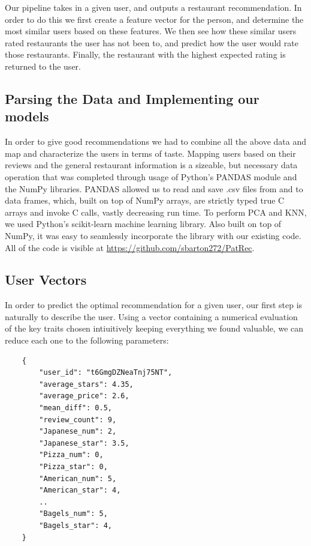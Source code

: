\documentclass[10pt,twocolumn,letterpaper]{article}
\begin{document}
Our pipeline takes in a given user, and outputs a restaurant recommendation. In order to do this we first create a feature vector for the person, and determine the most similar users based on these features. We then see how these similar users rated restaurants the user has not been to, and predict how the user would rate those restaurants. Finally, the restaurant with the highest expected rating is returned to the user.

\subsection{Parsing the Data and Implementing our models}
In order to give good recommendations we had to combine all the above data and map and characterize the users in terms of taste. Mapping users based on their reviews and the general restaurant information is a sizeable, but necessary data operation that was completed through usage of Python's PANDAS module and the NumPy libraries. PANDAS allowed us to read and save .csv files from and to data frames, which, built on top of NumPy arrays, are strictly typed true C arrays and invoke C calls, vastly decreasing run time. To perform PCA and KNN, we used Python's scikit-learn machine learning library. Also built on top of NumPy, it was easy to seamlessly incorporate the library with our existing code. All of the code is visible at \url{https://github.com/sbarton272/PatRec}.

\subsection{User Vectors}
In order to predict the optimal recommendation for a given user, our first step is naturally to describe the user. Using a vector containing a numerical evaluation of the key traits chosen intiuitively keeping everything we found valuable, we can reduce each one to the following parameters:
\begin{verbatim}
	{
	    "user_id": "t6GmgDZNeaTnj75NT",
	    "average_stars": 4.35,
	    "average_price": 2.6,
	   	"mean_diff": 0.5,
	   	"review_count": 9,
	   	"Japanese_num": 2,
	   	"Japanese_star": 3.5,
	   	"Pizza_num": 0,
	   	"Pizza_star": 0,
	   	"American_num": 5,
	   	"American_star": 4,
	   	..
	   	"Bagels_num": 5,
	   	"Bagels_star": 4,
	}
\end{verbatim}
\end{document}
